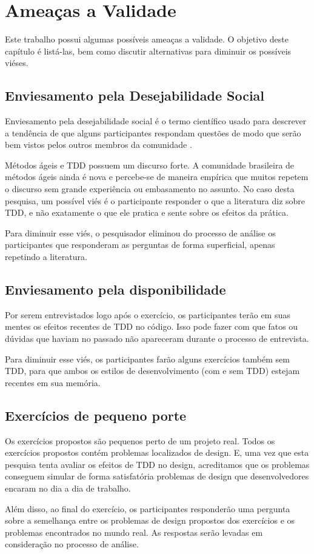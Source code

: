 \chapter{Ameaças a Validade}
\label{cap:ameacas}

Este trabalho possui algumas possíveis ameaças a validade. O objetivo
deste capítulo é listá-las, bem como discutir alternativas para diminuir
os possíveis viéses.

\section{Enviesamento pela Desejabilidade Social}

Enviesamento pela desejabilidade social é o termo científico usado para descrever
a tendência de que alguns participantes respondam questões de modo que serão
bem vistos pelos outros membros da comunidade \cite{crowne}.

Métodos ágeis e TDD possuem um discurso forte. A comunidade brasileira de métodos
ágeis ainda é nova e percebe-se de maneira empírica que muitos repetem o discurso
sem grande experiência ou embasamento no assunto.
No caso desta pesquisa, um possível viés é o participante responder o que
a literatura diz sobre TDD, e não exatamente o que ele pratica e sente sobre
os efeitos da prática. 

Para diminuir esse viés, o pesquisador eliminou do processo de análise os participantes
que responderam as perguntas de forma superficial, apenas repetindo a literatura.

\section{Enviesamento pela disponibilidade}

Por serem entrevistados logo após o exercício, os participantes terão
em suas mentes os efeitos recentes de TDD no código. Isso pode fazer 
com que fatos ou dúvidas que haviam no passado não apareceram durante o 
processo de entrevista.

Para diminuir esse viés, os participantes farão alguns exercícios também
sem TDD, para que ambos os estilos de desenvolvimento (com e sem TDD) estejam
recentes em sua memória.

\section{Exercícios de pequeno porte}

Os exercícios propostos são pequenos perto de um projeto real. Todos os exercícios propostos contém
problemas localizados de design. E, uma vez que esta pesquisa tenta avaliar os efeitos de TDD no design, 
acreditamos que os problemas conseguem simular de forma satisfatória
problemas de design que desenvolvedores encaram no dia a dia de trabalho.

Além disso, ao final do exercício, os participantes responderão uma pergunta sobre a semelhança
entre os problemas de design propostos dos exercícios e os problemas encontrados no mundo real.
As respostas serão levadas em consideração no processo de análise.